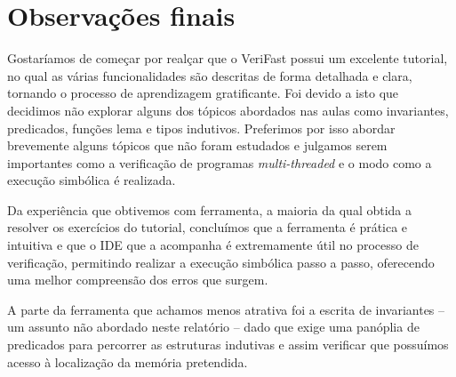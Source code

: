 \section{Observações finais}

Gostaríamos de começar por realçar que o VeriFast possui um excelente tutorial, no qual as várias funcionalidades são descritas de forma detalhada e clara, tornando o processo de aprendizagem gratificante. Foi devido a isto que decidimos não explorar alguns dos tópicos abordados nas aulas como invariantes, predicados, funções lema e tipos indutivos. Preferimos por isso abordar brevemente alguns tópicos que não foram estudados e julgamos serem importantes como a verificação de programas \textit{multi-threaded} e o modo como a execução simbólica é realizada.

Da experiência que obtivemos com ferramenta, a maioria da qual obtida a resolver os exercícios do tutorial, concluímos que a ferramenta é prática e intuitiva e que o IDE que a acompanha é extremamente útil no processo de verificação, permitindo realizar a execução simbólica passo a passo, oferecendo uma melhor compreensão dos erros que surgem.

A parte da ferramenta que achamos menos atrativa foi a escrita de invariantes -- um assunto não abordado neste relatório -- dado que exige uma panóplia de predicados para percorrer as estruturas indutivas e assim verificar que possuímos acesso à localização da memória pretendida.
